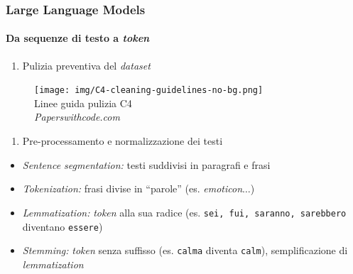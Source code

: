 %
\begin{frame}[t] \frametitle{Large Language Models}
\framesubtitle{Da sequenze di testo a \emph{token}}
{\scriptsize
    \begin{minipage}[t]{\textwidth}
        \begin{minipage}[t]{.50\textwidth}
            \vspace*{-.5cm}
        \begin{enumerate}[leftmargin=10pt,align=right]
            \item[\alertedcircled{1}] Pulizia preventiva del \emph{dataset}
        \end{enumerate}
            \begin{figure}
                \centering
                \texttt{[image: img/C4-cleaning-guidelines-no-bg.png]}
                 {\tiny\\Linee guida pulizia C4\\\vspace*{-1pt}\textit{\textcopyright Paperswithcode.com}}
            \end{figure}
        \end{minipage}
        \hfill
        \begin{minipage}[t]{.45\textwidth}
            \vspace*{-.5cm}
            \begin{enumerate}[leftmargin=10pt,align=right]
                \item[\alertedcircled{2}] Pre-processamento e normalizzazione dei testi
            \end{enumerate}
            \begin{itemize}[leftmargin=10pt,align=right]
                \item[\alert{\faArrowCircleRight}] \emph{\alert{Sentence segmentation:}} testi suddivisi in paragrafi e frasi
                \item[\alert{\faArrowCircleRight}] \emph{\alert{Tokenization:}} frasi divise in ``parole'' (es. \emph{emoticon}$\ldots$)
                \item[\alert{\faArrowCircleRight}] \emph{\alert{Lemmatization:}} \emph{token} alla sua radice (es. \texttt{sei, fui, saranno, sarebbero} diventano \texttt{essere})
                \item[\alert{\faArrowCircleRight}] \emph{\alert{Stemming:}} \emph{token} senza suffisso (es. \texttt{calma} diventa \texttt{calm}), semplificazione di \emph{lemmatization}
            \end{itemize}
        \end{minipage}
    \end{minipage}
}
\end{frame}
